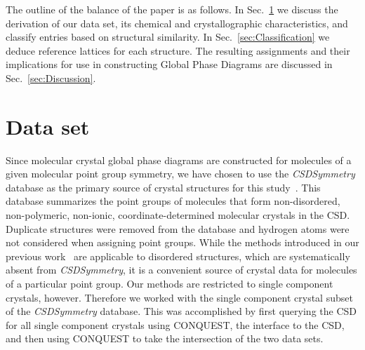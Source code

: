 \documentclass{iucr}              %
\begin{document}
The outline of the balance of the paper is as follows. In Sec.~\ref{sec:Data} we discuss the derivation of our data set, its chemical and crystallographic characteristics, and classify entries based on structural similarity. In Sec.~\ref{sec:Classification} we deduce reference lattices for each structure.  The resulting assignments and their implications for use in constructing Global Phase Diagrams are discussed in Sec.~\ref{sec:Discussion}.

\section{Data set}
\label{sec:Data}

Since molecular crystal global phase diagrams are constructed for molecules of a given molecular point group symmetry, we have chosen to use the \emph{CSDSymmetry} database as the primary source of crystal structures for this study~\cite{Yao02}. This database summarizes the point groups of molecules that form non-disordered, non-polymeric, non-ionic, coordinate-determined molecular crystals in the CSD.  Duplicate structures were removed from the database and hydrogen atoms were not considered when assigning point groups. While the methods introduced in our previous work~\cite{Mettes04} are applicable to disordered structures, which are systematically absent from \emph{CSDSymmetry}, it is a convenient source of crystal data for molecules of a particular point group. Our methods are restricted to single component crystals, however. Therefore we worked with the single component crystal subset of the \emph{CSDSymmetry} database.  This was accomplished by first querying the CSD for all single component crystals using {C\small ONQUEST}, the interface to the CSD, and then using {C\small ONQUEST} to take the intersection of the two data sets.
\end{document}
